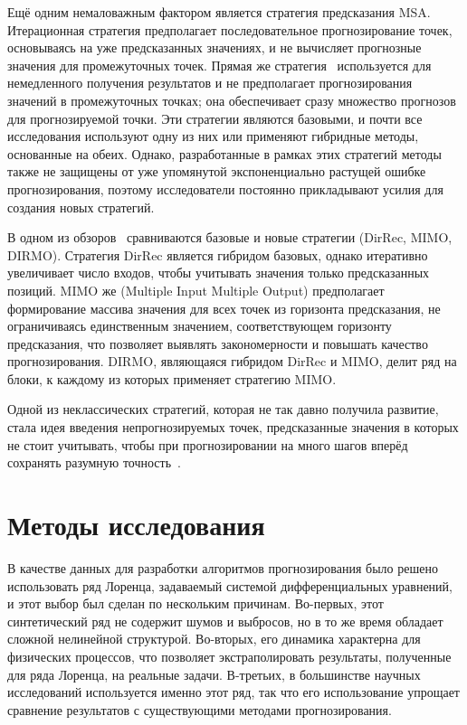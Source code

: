 \documentclass[a4paper, 12pt]{extarticle}
\begin{document}
Ещё одним немаловажным фактором является стратегия предсказания MSA. Итерационная стратегия предполагает последовательное прогнозирование точек, основываясь на уже предсказанных значениях, и не вычисляет прогнозные значения для промежуточных точек. Прямая же стратегия~\cite{Taieb12} используется для немедленного получения результатов и не предполагает прогнозирования значений в промежуточных точках; она обеспечивает сразу множество прогнозов для прогнозируемой точки. Эти стратегии являются базовыми, и почти все исследования используют одну из них или применяют гибридные методы, основанные на обеих. Однако, разработанные в рамках этих стратегий методы также не защищены от уже упомянутой экспоненциально растущей ошибке прогнозирования, поэтому исследователи постоянно прикладывают усилия для создания новых стратегий.

В одном из обзоров~\cite{Taieb12} сравниваются базовые и новые стратегии (DirRec, MIMO, DIRMO). Стратегия DirRec является гибридом базовых, однако итеративно увеличивает число входов, чтобы учитывать значения только предсказанных позиций. MIMO же (Multiple Input Multiple Output) предполагает формирование массива значения для всех точек из горизонта предсказания, не ограничиваясь единственным значением, соответствующем горизонту предсказания, что позволяет выявлять закономерности и повышать качество прогнозирования. DIRMO, являющаяся гибридом DirRec и MIMO, делит ряд на блоки, к каждому из которых применяет стратегию MIMO.

Одной из неклассических стратегий, которая не так давно получила развитие, стала идея введения непрогнозируемых точек, предсказанные значения в которых не стоит учитывать, чтобы при прогнозировании на много шагов вперёд сохранять разумную точность~\cite{Gromov15}.

\section{Методы исследования}
В качестве данных для разработки алгоритмов прогнозирования было решено использовать ряд Лоренца, задаваемый системой дифференциальных уравнений, и этот выбор был сделан по нескольким причинам. Во-первых, этот синтетический ряд не содержит шумов и выбросов, но в то же время обладает сложной нелинейной структурой. Во-вторых, его динамика характерна для физических процессов, что позволяет экстраполировать результаты, полученные для ряда Лоренца, на реальные задачи. В-третьих, в большинстве научных исследований используется именно этот ряд, так что его использование упрощает сравнение результатов с существующими методами прогнозирования.
\end{document}
